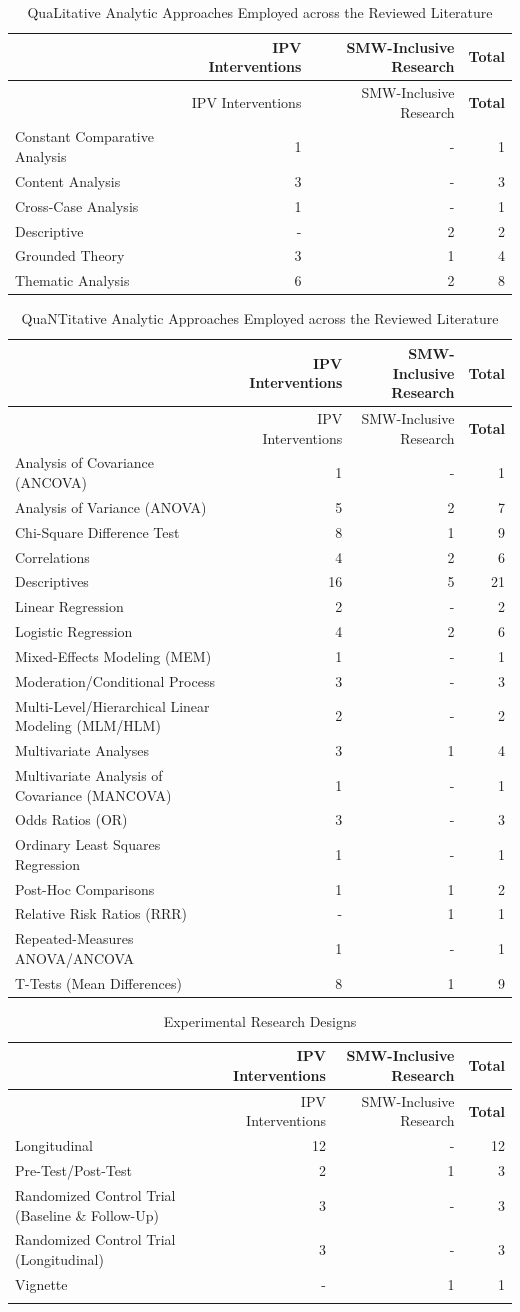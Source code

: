 \documentclass[11pt,]{tufte-book}
\begin{document}
\newpage

\begin{longtable}[]{@{}lrrr@{}}
\caption{QuaLitative Analytic Approaches Employed across the Reviewed
Literature \label{tbl:aql}}\tabularnewline
\toprule
& IPV Interventions & SMW-Inclusive Research &
\textbf{Total}\tabularnewline
\midrule
\endfirsthead
\toprule
& IPV Interventions & SMW-Inclusive Research &
\textbf{Total}\tabularnewline
\midrule
\endhead
Constant Comparative Analysis & 1 & - & 1\tabularnewline
Content Analysis & 3 & - & 3\tabularnewline
Cross-Case Analysis & 1 & - & 1\tabularnewline
Descriptive & - & 2 & 2\tabularnewline
Grounded Theory & 3 & 1 & 4\tabularnewline
Thematic Analysis & 6 & 2 & 8\tabularnewline
\bottomrule
\end{longtable}

\newpage

\begin{longtable}[]{@{}lrrr@{}}
\caption{QuaNTitative Analytic Approaches Employed across the Reviewed
Literature \label{tbl:aqt}}\tabularnewline
\toprule
& IPV Interventions & SMW-Inclusive Research &
\textbf{Total}\tabularnewline
\midrule
\endfirsthead
\toprule
& IPV Interventions & SMW-Inclusive Research &
\textbf{Total}\tabularnewline
\midrule
\endhead
Analysis of Covariance (ANCOVA) & 1 & - & 1\tabularnewline
Analysis of Variance (ANOVA) & 5 & 2 & 7\tabularnewline
Chi-Square Difference Test & 8 & 1 & 9\tabularnewline
Correlations & 4 & 2 & 6\tabularnewline
Descriptives & 16 & 5 & 21\tabularnewline
Linear Regression & 2 & - & 2\tabularnewline
Logistic Regression & 4 & 2 & 6\tabularnewline
Mixed-Effects Modeling (MEM) & 1 & - & 1\tabularnewline
Moderation/Conditional Process & 3 & - & 3\tabularnewline
Multi-Level/Hierarchical Linear Modeling (MLM/HLM) & 2 & - &
2\tabularnewline
Multivariate Analyses & 3 & 1 & 4\tabularnewline
Multivariate Analysis of Covariance (MANCOVA) & 1 & - & 1\tabularnewline
Odds Ratios (OR) & 3 & - & 3\tabularnewline
Ordinary Least Squares Regression & 1 & - & 1\tabularnewline
Post-Hoc Comparisons & 1 & 1 & 2\tabularnewline
Relative Risk Ratios (RRR) & - & 1 & 1\tabularnewline
Repeated-Measures ANOVA/ANCOVA & 1 & - & 1\tabularnewline
T-Tests (Mean Differences) & 8 & 1 & 9\tabularnewline
\bottomrule
\end{longtable}

\newpage

\begin{longtable}[]{@{}lrrr@{}}
\caption{Experimental Research Designs \label{tbl:expp}}\tabularnewline
\toprule
& IPV Interventions & SMW-Inclusive Research &
\textbf{Total}\tabularnewline
\midrule
\endfirsthead
\toprule
& IPV Interventions & SMW-Inclusive Research &
\textbf{Total}\tabularnewline
\midrule
\endhead
Longitudinal & 12 & - & 12\tabularnewline
Pre-Test/Post-Test & 2 & 1 & 3\tabularnewline
Randomized Control Trial (Baseline \& Follow-Up) & 3 & - &
3\tabularnewline
Randomized Control Trial (Longitudinal) & 3 & - & 3\tabularnewline
Vignette & - & 1 & 1\tabularnewline
\newpage & & &\tabularnewline
\bottomrule
\end{longtable}
\end{document}
